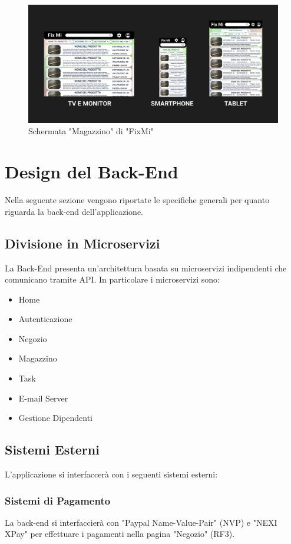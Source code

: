 \documentclass{report}
\begin{document}
\begin{figure}[H]
	\centering
	\includegraphics[width=1\textwidth]{images/Snapshots/magazzino_snapshot.png}
	\caption{Schermata "Magazzino" di "FixMi"}
\end{figure}	


\section{Design del Back-End}

Nella seguente sezione vengono riportate le specifiche generali per quanto riguarda la back-end dell’applicazione.

\subsection{Divisione in Microservizi}

La Back-End presenta un’architettura basata su microservizi indipendenti che comunicano tramite API. In particolare i microservizi sono:
\begin{itemize}
	\item Home
	\item Autenticazione
	\item Negozio
	\item Magazzino
	\item Task
	\item E-mail Server
	\item Gestione Dipendenti
\end{itemize}

\subsection{Sistemi Esterni}
L’applicazione si interfaccerà con i seguenti sistemi esterni:

\subsubsection{Sistemi di Pagamento}
La back-end si interfaccierà con "Paypal Name-Value-Pair" (NVP) e "NEXI XPay" per effettuare i pagamenti nella pagina "Negozio" (RF3). 
\end{document}
